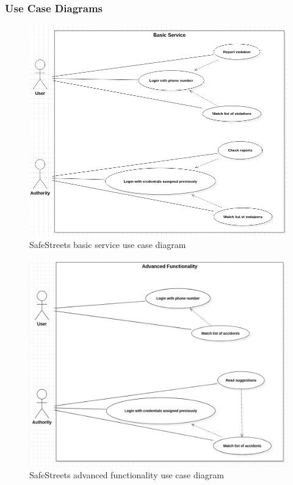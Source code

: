 \subsubsection{Use Case Diagrams}

\begin{figure}[H]
    \includegraphics[scale=0.41]{Images/Diagrams/UseCase1.png}
    \caption{\label{fig:UseCase1}SafeStreets basic service use case diagram}
\end{figure}

\begin{figure}[H]
    \includegraphics[scale=0.34]{Images/Diagrams/UseCase2.png}
    \caption{\label{fig:UseCase2}SafeStreets advanced functionality use case diagram}
\end{figure}

